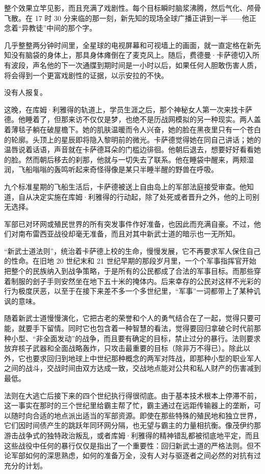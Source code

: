 \documentclass[AutoFakeBold=true]{book}
\begin{document}
整个效果立竿见影，而且充满了戏剧性。每个目标瞬时脑浆沸腾，然后气化、颅骨飞散。在 17 时 30 分来临的那一刻，新先知的现场全球广播正讲到一半——他正念着``异教徒''中间的那个字。

几乎整整两分钟时间里，全星球的电视屏幕和可视墙上的画面，就一直定格在新先知没有脑袋的身体上，那具身体瘫倒在了麦克风上。随后，费德曼·卡萨德切入所有波段，声名他的下一次通牒到期时间是一小时以后，如果任何人胆敢伤害人质，将会得到一个更富戏剧性的证据，以示安拉的不快。

没有人报复。

这晚，在库姆·利雅得的轨道上，学员生涯之后，那个神秘女人第一次来找卡萨德。他睡着了，但那来访不仅仅是梦，也绝不是历战网模拟的另一种现实。两人盖着薄毯子躺在破屋檐下。她的肌肤温暖而令人兴奋，她的脸在黑夜里只有一个苍白的轮廓。头顶上的星辰即将隐入黎明前的微光。卡萨德觉得她在同自己讲话；她的温唇说着话语，声音就在卡萨德耳朵的门槛边徘徊。他朝后退去，想要好好看看她的脸。然而朝后移去的刹那，他就与一切失去了联系。他在睡袋中醒来，两颊湿润，飞船嗡嗡的轰鸣听起来奇怪得像是某只半睡半醒的野兽在呼吸。

\vspace*{1em}

九个标准星期的飞船生活后，卡萨德被送上自由岛上的军部法庭接受审查。他知道，自从决定实施在库姆·利雅得的行动起，除了处死或者晋升之外，他的上司别无选择。

\vspace*{1em}

军部已对环网或殖民世界的所有突发事件作好准备，也因此而充满自豪。不过，他们对南布雷西亚战役却毫无准备，而且对其中新武士道的暗示也一无所知。

``新武士道法则''，统治着卡萨德上校的生命，慢慢发展，它不再要求军人保住自己的性命。在旧地 20 世纪末和 21 世纪早期的那段岁月里，一个个军事指挥官开始把整个的民族纳入到战争策略，于是所有的公民都成了合法的军事目标。而那些穿着制服的刽子手则安然坐在地下五十米的掩体内。后来幸存的公民对这样不光彩的行为极度厌恶，以至于在接下来差不多一个多世纪里，``军事''一词都带上了某种讥讽的意味。

随着新武士道慢慢演化，它把古老的荣誉和个人的勇气结合在了一起，觉得只要可能，就要手下留情。同时它也包含着一种智慧的看法，觉得要回归拿破仑时代前那种小型、``非全面发动''的战争，而且要有确定的目标，禁止过分的暴行。法则要求放弃核子武器和全面战略轰炸，只攻击最重要的目标（除非万不得已）。除此以外，它也要求回归到地球上中世纪那种概念的两军对阵战，即那种小型的职业军人之间的战斗，交战时间由双方达成一致，交战地点能对公共和私人财产的伤害减到最低。

法则在大逃亡后接下来的四个世纪执行得很彻底。由于基本技术根本上停滞不前，这一事实在那时的三个世纪里给霸主帮了忙，霸主通过在远距传输器上的垄断，可以随时向合适的地点派出适当的军部资源。即使在那些特殊的殖民地和独立世界，它们因时间债产生的跳跃年同环网分隔，也无望与霸主的力量相抗衡。像茂伊约那游击战争式的独特政治叛乱，或者库姆·利雅得的精神错乱都被彻底地平定，而且这些战役中任何的暴行仅仅是指出了一个重要性：回归新武士道的严格法则。但不论军部如何的深思熟虑，如何的准备万全，没有人对与驱逐者之间必然的对抗有过充分的计划。
\end{document}
